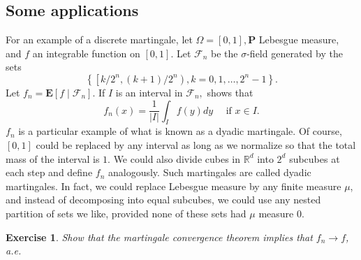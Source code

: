 \documentclass[twoside, 12pt]{book}
\numberwithin{equation}{chapter}
\newtheorem{exercise}{Exercise}[section]
\begin{document}
	
	\subsection{Some applications}
	
	For an example of a discrete martingale, let $\Omega=[0,1], \mathbf{P}$ Lebesgue measure, and $f$ an integrable function on $[0,1]$. Let $\mathcal{F}_n$ be the $\sigma$-field generated by the sets 
	\[
	\left\{\left[k / 2^n,(k+1) / 2^n\right), k=0,1, \ldots, 2^n-1\right\}. 
	\]
	Let $f_n=\mathbf{E}\left[f \mid \mathcal{F}_n\right]$. If $I$ is an interval in $\mathcal{F}_n,$ shows that
	$$
	f_n(x)=\frac{1}{|I|} \int_I f(y) d y \quad \text { if } x \in I.
	$$
	$f_n$ is a particular example of what is known as a dyadic martingale. Of course, $[0,1]$ could be replaced by any interval as long as we normalize so that the total mass of the interval is $1$. We could also divide cubes in $\mathbb{R}^d$ into $2^d$ subcubes at each step and define $f_n$ analogously. Such martingales are called dyadic martingales. In fact, we could replace Lebesgue measure by any finite measure $\mu$, and instead of decomposing into equal subcubes, we could use any nested partition of sets we like, provided none of these sets had $\mu$ measure $0$.
	\begin{exercise}
		Show that the martingale convergence theorem implies that $f_n\to f$, a.e. 
	\end{exercise}
	
\end{document}
